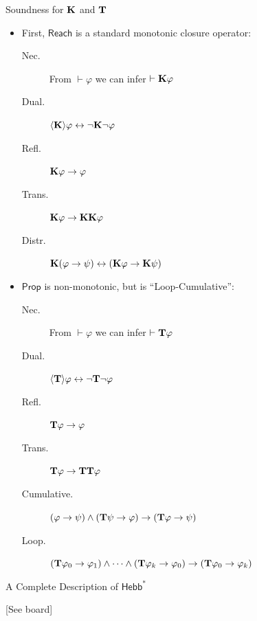 \documentclass[12pt,t]{beamer}
\theoremstyle{definition}
\newcommand{\proves}{\vdash}
\newcommand{\Prop}{\mathsf{Prop}}
\newcommand{\Reach}{\mathsf{Reach}}
\newcommand{\HebbstarNoArgs}{\mathsf{Hebb}^*}
\newcommand{\Typ}[1]{\textrm{\textup{\textbf{T}}} #1}
\newcommand{\Know}[1]{\textrm{\textup{\textbf{K}}} #1}
\newcommand{\KnowNoArgs}{\textrm{\textup{\textbf{K}}}}
\newcommand{\TypNoArgs}{\textrm{\textup{\textbf{T}}}}
\newcommand{\diaTyp}[1]{\langle \textrm{\textup{\textbf{T}}} \rangle #1}
\newcommand{\diaKnow}[1]{\langle \textrm{\textup{\textbf{K}}} \rangle #1}
\begin{document}
\begin{frame}{Soundness for $\KnowNoArgs$ and $\TypNoArgs$}
\centering

\begin{itemize}
    \item First, $\Reach$ is a standard monotonic closure operator:
    \begin{description}
        \item[Nec.] From $\proves \varphi$ we can infer $\proves \Know{\varphi}$
        \item[Dual.] $\diaKnow{\varphi} \leftrightarrow \neg \Know{\neg \varphi}$
        \item[Refl.] $\Know{\varphi} \to \varphi$
        \item[Trans.] $\Know{\varphi} \to \Know{\Know{\varphi}}$
        \item[Distr.] $\Know{(\varphi \to \psi)} \leftrightarrow (\Know{\varphi} \to \Know{\psi})$
    \end{description}

    \vspace{1ex}
    \item $\Prop$ is non-monotonic, but is ``Loop-Cumulative'':
    \begin{description}
        \item[Nec.] From $\proves \varphi$ we can infer $\proves \Typ{\varphi}$
        \item[Dual.] $\diaTyp{\varphi} \leftrightarrow \neg \Typ{\neg \varphi}$
        \item[Refl.] $\Typ{\varphi} \to \varphi$
        \item[Trans.] $\Typ{\varphi} \to \Typ{\Typ{\varphi}}$
        \item[Cumulative.] $(\varphi \to \psi) \land (\Typ{\psi} \to \varphi) \to (\Typ{\varphi} \to \psi)$
        \item[Loop.] \small $(\Typ \varphi_0 \to \varphi_1) \land \cdots \land (\Typ \varphi_k \to \varphi_0) \to (\Typ \varphi_0 \to \varphi_k)$ \normalsize
    \end{description}
\end{itemize}

\end{frame}

\begin{frame}{A Complete Description of $\HebbstarNoArgs$}
\vspace{1ex}
\centering

\vspace{12ex}
[See board]

\end{frame}
\end{document}
